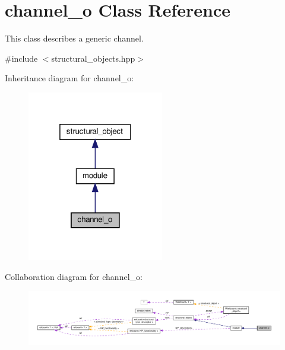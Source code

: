 \hypertarget{classchannel__o}{}\section{channel\+\_\+o Class Reference}
\label{classchannel__o}


This class describes a generic channel.  




{\ttfamily \#include $<$structural\+\_\+objects.\+hpp$>$}



Inheritance diagram for channel\+\_\+o\+:
\nopagebreak
\begin{figure}[H]
\begin{center}
\leavevmode
\includegraphics[width=169pt]{d1/d03/classchannel__o__inherit__graph}
\end{center}
\end{figure}


Collaboration diagram for channel\+\_\+o\+:
\nopagebreak
\begin{figure}[H]
\begin{center}
\leavevmode
\includegraphics[width=350pt]{dc/ddb/classchannel__o__coll__graph}
\end{center}
\end{figure}

